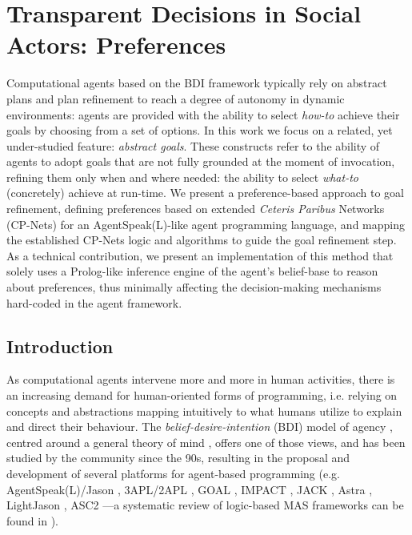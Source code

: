 \chapter{Transparent Decisions in Social Actors: Preferences}

Computational agents based on the BDI framework typically rely on abstract plans and plan refinement to reach a degree of autonomy in dynamic environments: agents are provided with the 
ability to select \textit{how-to} achieve their goals by choosing from a set of options. In this work we focus on a related, yet under-studied feature: \textit{abstract goals}. These constructs refer to the ability of agents to adopt goals that are not fully grounded at the moment of invocation, refining them only when and where needed: the ability to select \textit{what-to} (concretely) achieve at run-time. We present a preference-based approach to goal refinement,  defining preferences based on extended \textit{Ceteris Paribus} Networks (CP-Nets) for an AgentSpeak(L)-like agent programming language, and mapping the established CP-Nets logic and algorithms to guide the goal refinement step. As a technical contribution, we present an implementation of this method that solely uses a Prolog-like inference engine of the agent's belief-base to reason about preferences, thus minimally affecting the decision-making mechanisms hard-coded in the agent framework.


\section{Introduction}
As computational agents intervene more and more in human activities, there is an increasing demand for human-oriented forms of programming, i.e. relying on concepts and abstractions mapping intuitively to what humans utilize to explain and direct their behaviour. The \textit{belief-desire-intention} (BDI) model of agency \cite{Rao1995}, centred around a general theory of mind \cite{bratman1987intention}, offers one of those views, and has been studied by the community since the 90s, resulting in the proposal and development of several platforms for agent-based programming (e.g. AgentSpeak(L)/Jason \cite{RaoAS1996,Bordini2005}, 3APL/2APL \cite{Dastani2APL}, GOAL \cite{Hindriks2009a}, IMPACT \cite{IMPACT}, JACK \cite{JACK}, Astra \cite{ASTRA}, LightJason \cite{Aschermann2018}, ASC2 \cite{mohajeriparizi_2020_run}---a  systematic review of logic-based MAS frameworks can be found in \cite{MASReview2021}).

